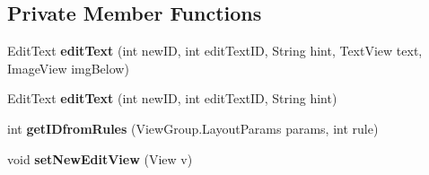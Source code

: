 \subsection*{Private Member Functions}
\begin{DoxyCompactItemize}
\item 
Edit\+Text {\bfseries edit\+Text} (int new\+ID, int edit\+Text\+ID, String hint, Text\+View text, Image\+View img\+Below)\hypertarget{classcom_1_1example_1_1sebastian_1_1tindertp_1_1InterestsActivity_a3a8693c81ca9ccf2c7c7ec185be6cbee}{}\label{classcom_1_1example_1_1sebastian_1_1tindertp_1_1InterestsActivity_a3a8693c81ca9ccf2c7c7ec185be6cbee}

\item 
Edit\+Text {\bfseries edit\+Text} (int new\+ID, int edit\+Text\+ID, String hint)\hypertarget{classcom_1_1example_1_1sebastian_1_1tindertp_1_1InterestsActivity_a1ea5cd773c1b2014f12a891d8f93b35b}{}\label{classcom_1_1example_1_1sebastian_1_1tindertp_1_1InterestsActivity_a1ea5cd773c1b2014f12a891d8f93b35b}

\item 
int {\bfseries get\+I\+Dfrom\+Rules} (View\+Group.\+Layout\+Params params, int rule)\hypertarget{classcom_1_1example_1_1sebastian_1_1tindertp_1_1InterestsActivity_ab474d7d67540a3d57697f9c140288443}{}\label{classcom_1_1example_1_1sebastian_1_1tindertp_1_1InterestsActivity_ab474d7d67540a3d57697f9c140288443}

\item 
void {\bfseries set\+New\+Edit\+View} (View v)\hypertarget{classcom_1_1example_1_1sebastian_1_1tindertp_1_1InterestsActivity_a486dcd2a173c5ecab14e3b6b871a0eb3}{}\label{classcom_1_1example_1_1sebastian_1_1tindertp_1_1InterestsActivity_a486dcd2a173c5ecab14e3b6b871a0eb3}

\end{DoxyCompactItemize}

